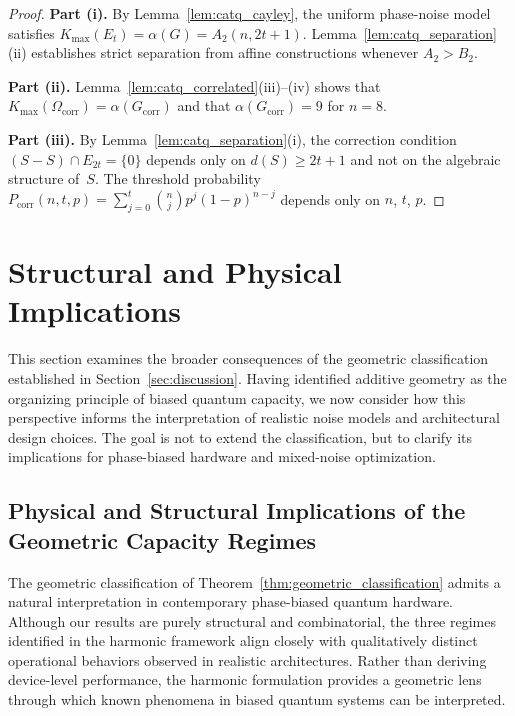 \documentclass[a4paper,twocolumn,11pt,allowtoday]{quantumarticle}
\theoremstyle{plain}
\theoremstyle{definition}
\theoremstyle{remark}
\begin{document}
\begin{proof}
\textbf{Part (i).}
By Lemma~\ref{lem:catq_cayley}, the uniform phase-noise model
satisfies $K_{\max}(E_t)=\alpha(G)=A_2(n,2t+1)$.
Lemma~\ref{lem:catq_separation}(ii) establishes strict separation
from affine constructions whenever $A_2>B_2$.

\textbf{Part (ii).}
Lemma~\ref{lem:catq_correlated}(iii)--(iv) shows that
$K_{\max}(\Omega_{\mathrm{corr}})=\alpha(G_{\mathrm{corr}})$ and
that $\alpha(G_{\mathrm{corr}})=9$ for $n=8$.

\textbf{Part (iii).}
By Lemma~\ref{lem:catq_separation}(i), the correction condition
$(S-S)\cap E_{2t}=\{0\}$ depends only on $d(S)\ge 2t+1$ and not on the
algebraic structure of~$S$. The threshold probability
$P_{\mathrm{corr}}(n,t,p) = \sum_{j=0}^{t}\binom{n}{j}p^j(1-p)^{n-j}$
depends only on $n$, $t$, $p$.
\end{proof}
\section{Structural and Physical Implications}
\label{sec:implications}

This section examines the broader consequences of the geometric classification established in Section~\ref{sec:discussion}. Having identified additive geometry as the organizing principle of biased quantum capacity, we now consider how this perspective informs the interpretation of realistic noise models and architectural design choices. The goal is not to extend the classification, but to clarify its implications for phase-biased hardware and mixed-noise optimization.

\subsection{Physical and Structural Implications of the Geometric Capacity Regimes}
\label{subsec:physical_structural_implications}

The geometric classification of Theorem~\ref{thm:geometric_classification} admits a natural interpretation in contemporary phase-biased quantum hardware. Although our results are purely structural and combinatorial, the three regimes identified in the harmonic framework align closely with qualitatively distinct operational behaviors observed in realistic architectures. Rather than deriving device-level performance, the harmonic formulation provides a geometric lens through which known phenomena in biased quantum systems can be interpreted.
\end{document}
